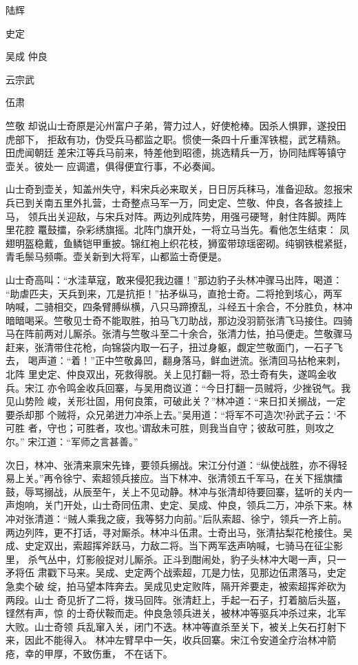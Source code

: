 陆辉

史定

吴成
仲良

云宗武

伍肃

竺敬
却说山士奇原是沁州富户子弟，膂力过人，好使枪棒。因杀人惧罪，遂投田虎部下，
拒敌有功，伪受兵马都监之职。惯使一条四十斤重浑铁棍，武艺精熟。田虎闻朝廷
差宋江等兵马前来，特差他到昭德，挑选精兵一万，协同陆辉等镇守壶关。彼处一
应调遣，俱得便宜行事，不必奏闻。

山士奇到壶关，知盖州失守，料宋兵必来取关，日日厉兵秣马，准备迎敌。忽报宋
兵已到关南五里外扎营，士奇整点马军一万，同史定、竺敬、仲良，各各披挂上马，
领兵出关迎敌，与宋兵对阵。两边列成阵势，用强弓硬弩，射住阵脚。两阵里花腔
鼍鼓擂，杂彩绣旗摇。北阵门旗开处，一将立马当先。看他怎生结束：
凤翅明盔稳戴，鱼鳞铠甲重披。锦红袍上织花枝，狮蛮带琼瑶密砌。纯钢铁棍紧挺，
青毛鬃马频嘶。壶关新到大将军，山都监士奇便是。

山士奇高叫：“水洼草寇，敢来侵犯我边疆！”那边豹子头林冲骤马出阵，喝道：
“助虐匹夫，天兵到来，兀是抗拒！”拈矛纵马，直抢士奇。二将抢到垓心，两军
呐喊，二骑相交，四条臂膊纵横，八只马蹄撩乱，斗经五十余合，不分胜负，林冲
暗暗喝采。竺敬见士奇不能取胜，拍马飞刀助战，那边没羽箭张清飞马接住。四骑
马在阵前两对儿厮杀。张清与竺敬斗至二十余合，张清力怯，拍马便走。竺敬骤马
赶来，张清带住花枪，向锦袋内取一石子，扭过身躯，觑定竺敬面门，一石子飞去，
喝声道：“着！”正中竺敬鼻凹，翻身落马，鲜血迸流。张清回马拈枪来刺，北阵
里史定、仲良双出，死救得脱。关上见打翻一将，恐士奇有失，遂鸣金收兵。宋江
亦令鸣金收兵回寨，与吴用商议道：“今日打翻一员贼将，少挫锐气。我见山势险
峻，关形壮固，用何良策，可破此关？”林冲道：“来日扣关搦战，一定要杀却那
个贼将，众兄弟迸力冲杀上去。”吴用道：“将军不可造次!孙武子云：‘不可胜
者，守也；可胜者，攻也。’谓敌未可胜，则我当自守；彼敌可胜，则攻之尔。”
宋江道：“军师之言甚善。”

次日，林冲、张清来禀宋先锋，要领兵搦战。宋江分付道：“纵使战胜，亦不得轻
易上关。”再令徐宁、索超领兵接应。当下林冲、张清领五千军马，在关下摇旗擂
鼓，辱骂搦战，从辰至午，关上不见动静。林冲与张清却待要回寨，猛听的关内一
声炮响，关门开处，山士奇同伍肃、史定、吴成、仲良，领兵二万，冲杀下来。林
冲对张清道：“贼人乘我之疲，我等努力向前。”后队索超、徐宁，领兵一齐上前。
两边列阵，更不打话，寻对厮杀。林冲斗伍肃。士奇出马，张清拈梨花枪接住。吴
成、史定双出，索超挥斧跃马，力敌二将。当下两军迭声呐喊，七骑马在征尘影里，
杀气丛中，灯影般捉对儿厮杀。正斗到酣闹处，豹子头林冲大喝一声，只一矛将伍
肃戳下马来。吴成、史定两个战索超，兀是力怯，见那边伍肃落马，史定急卖个破
绽，拍马望本阵奔去。吴成见史定败阵，隔开斧要走，被索超挥斧砍为两段。山士
奇见折了二将，拨马回阵。张清赶上，手起一石子，打着脑后头盔，铿然有声，惊
的士奇伏鞍而走。仲良急领兵进关，被林冲等驱兵冲杀过来，北军大败。山士奇领
兵乱窜入关，闭门不迭。林冲等直杀至关下，被关上矢石打射下来，因此不能得入。
林冲左臂早中一矢，收兵回寨。宋江令安道全疗治林冲箭疮，幸的甲厚，不致伤重，
不在话下。


